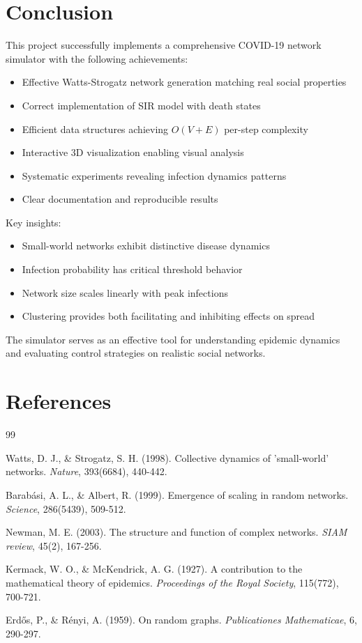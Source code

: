 \documentclass[12pt,a4paper]{article}
\begin{document}
\section{Conclusion}

This project successfully implements a comprehensive COVID-19 network simulator with the following achievements:

\begin{itemize}
    \item Effective Watts-Strogatz network generation matching real social properties
    \item Correct implementation of SIR model with death states
    \item Efficient data structures achieving $O(V+E)$ per-step complexity
    \item Interactive 3D visualization enabling visual analysis
    \item Systematic experiments revealing infection dynamics patterns
    \item Clear documentation and reproducible results
\end{itemize}

Key insights:
\begin{itemize}
    \item Small-world networks exhibit distinctive disease dynamics
    \item Infection probability has critical threshold behavior
    \item Network size scales linearly with peak infections
    \item Clustering provides both facilitating and inhibiting effects on spread
\end{itemize}

The simulator serves as an effective tool for understanding epidemic dynamics and evaluating control strategies on realistic social networks.

\section*{References}

\begin{thebibliography}{99}

 Watts, D. J., \& Strogatz, S. H. (1998). Collective dynamics of 'small-world' networks. \textit{Nature}, 393(6684), 440-442.

 Barabási, A. L., \& Albert, R. (1999). Emergence of scaling in random networks. \textit{Science}, 286(5439), 509-512.

 Newman, M. E. (2003). The structure and function of complex networks. \textit{SIAM review}, 45(2), 167-256.

 Kermack, W. O., \& McKendrick, A. G. (1927). A contribution to the mathematical theory of epidemics. \textit{Proceedings of the Royal Society}, 115(772), 700-721.

 Erdős, P., \& Rényi, A. (1959). On random graphs. \textit{Publicationes Mathematicae}, 6, 290-297.

\end{thebibliography}
\end{document}
